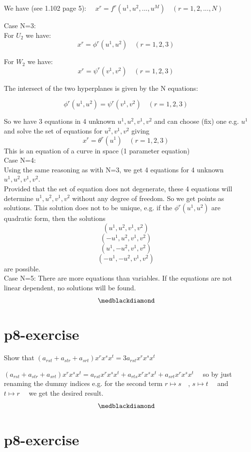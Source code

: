We have (see 1.102 page 5):
$\quad x^r = f^r(u^1, u^2,..., u^M) \quad (r = 1, 2, ...,N)$

Case N=3: \\

For $U_2$ we have:
$$x^r = \phi^r(u^1, u^2) \quad (r = 1, 2, 3)$$

For $W_2$ we have:
$$x^r = \psi^r(v^1, v^2) \quad (r = 1, 2, 3)$$

The intersect of the two hyperplanes is given by the N equations:

$$\phi^r(u^1, u^2) = \psi^r(v^1, v^2) \quad (r = 1, 2, 3)$$

So we have 3 equations in 4 unknown $u^1,u^2, v^1, v^2$ and can choose (fix) one e.g. $u^1$ and solve the set of equations  for $u^2, v^1, v^2$ giving 
$$x^r = \theta^r(u^1) \quad (r = 1, 2, 3)$$
This is an equation of a curve in space (1 parameter equation)\\
Case N=4: \\
Using the same reasoning as with N=3, we get 4 equations for 4 unknown $u^1,u^2, v^1, v^2$.\\
Provided that the set of equation does not degenerate, these 4 equations will determine $u^1,u^2, v^1, v^2$ without any degree of freedom. So we get  points as solutions. This solution does not to be unique, e.g. if the $\phi^r(u^1, u^2)$ are quadratic form, then the solutions 
$$(u^1,u^2, v^1, v^2)$$
$$(-u^1,u^2, v^1, v^2)$$
$$ (u^1,-u^2, v^1, v^2)$$
$$ (-u^1,-u^2, v^1, v^2)$$
are possible.\\
Case N=5: 
There are more equations than variables. If the equations are not linear dependent, no solutions will be found.
$$\medblackdiamond$$
\pagebreak[4]
\section{p8-exercise}

\begin{tcolorbox}
Show that $(a_{rst}+a_{str}+a_{srt})x^rx^sx^t = 3a_{rst}x^rx^sx^t$
\end{tcolorbox}
$(a_{rst}+a_{str}+a_{srt})x^rx^sx^t = a_{rst}x^rx^sx^t+a_{rts}x^rx^sx^t+a_{srt}x^rx^sx^t\quad$
so by just renaming the dummy indices e.g. for the second term  $r \mapsto s\quad$, $s \mapsto t\quad$ and $t \mapsto r\quad$ we get the desired result.
$$\medblackdiamond$$
\pagebreak[4]

\section{p8-exercise}

